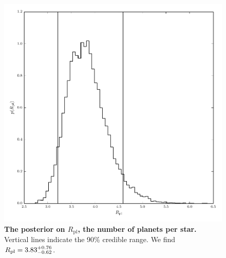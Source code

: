 \documentclass{nature}
\newcommand{\Rpl}{R_\mathrm{pl}}
\begin{document}
\begin{figure}
  \includegraphics[width=\columnwidth]{npl}
  \caption{\label{fig:npl} \textbf{The posterior on $\Rpl$, the number of planets per star.}  Vertical lines
    indicate the 90\% credible range.  We find $\Rpl =
    \rplrange$.}
\end{figure}
\end{document}
